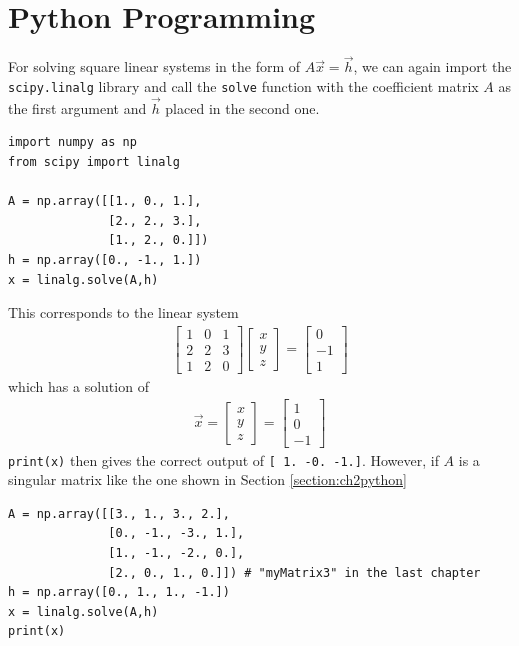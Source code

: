 \section{Python Programming}
\label{section:ch3python}
For solving square linear systems in the form of $A\vec{x} = \vec{h}$, we can again import the \verb|scipy.linalg| library and call the \verb|solve| function with the coefficient matrix $A$ as the first argument and $\vec{h}$ placed in the second one.
\begin{lstlisting}
import numpy as np
from scipy import linalg

A = np.array([[1., 0., 1.],
              [2., 2., 3.],
              [1., 2., 0.]])
h = np.array([0., -1., 1.])
x = linalg.solve(A,h)
\end{lstlisting}
This corresponds to the linear system
\begin{align*}
\begin{bmatrix}
1 & 0 & 1 \\
2 & 2 & 3 \\
1 & 2 & 0
\end{bmatrix}
\begin{bmatrix}
x \\
y \\ 
z
\end{bmatrix}
=
\begin{bmatrix}
0 \\
-1 \\ 
1
\end{bmatrix}
\end{align*}
which has a solution of
\begin{align*}
\vec{x}
=
\begin{bmatrix}
x \\
y \\ 
z
\end{bmatrix}
=
\begin{bmatrix}
1 \\
0 \\
-1
\end{bmatrix}    
\end{align*}
\verb|print(x)| then gives the correct output of \verb|[ 1. -0. -1.]|. However, if $A$ is a singular matrix like the one shown in Section \ref{section:ch2python}
\begin{lstlisting}
A = np.array([[3., 1., 3., 2.],
              [0., -1., -3., 1.],
              [1., -1., -2., 0.],
              [2., 0., 1., 0.]]) # "myMatrix3" in the last chapter
h = np.array([0., 1., 1., -1.])
x = linalg.solve(A,h)      
print(x)
\end{lstlisting}
